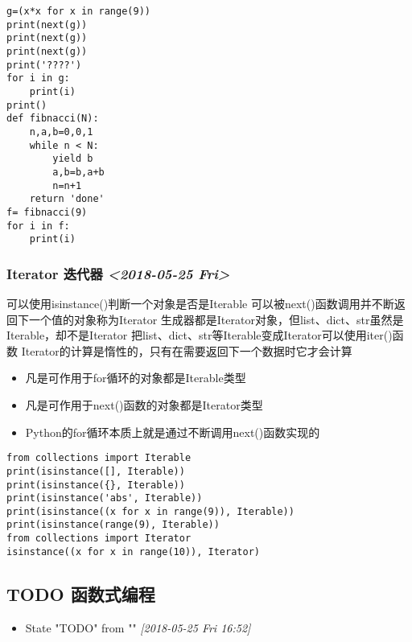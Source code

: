 \documentclass[11pt]{article}
\begin{document}
\begin{verbatim}
g=(x*x for x in range(9))
print(next(g))
print(next(g))
print(next(g))
print('????')
for i in g:
    print(i)
print()
def fibnacci(N):
    n,a,b=0,0,1
    while n < N:
        yield b
        a,b=b,a+b
        n=n+1
    return 'done'
f= fibnacci(9)
for i in f:
    print(i)
\end{verbatim}

\subsubsection{Iterator 迭代器 \textit{<2018-05-25 Fri>}}
\label{sec:org02ee4cb}
可以使用isinstance()判断一个对象是否是Iterable
可以被next()函数调用并不断返回下一个值的对象称为Iterator
生成器都是Iterator对象，但list、dict、str虽然是Iterable，却不是Iterator
把list、dict、str等Iterable变成Iterator可以使用iter()函数
Iterator的计算是惰性的，只有在需要返回下一个数据时它才会计算
\begin{itemize}
\item 凡是可作用于for循环的对象都是Iterable类型
\item 凡是可作用于next()函数的对象都是Iterator类型
\item Python的for循环本质上就是通过不断调用next()函数实现的
\end{itemize}
\begin{verbatim}
from collections import Iterable
print(isinstance([], Iterable))
print(isinstance({}, Iterable))
print(isinstance('abs', Iterable))
print(isinstance((x for x in range(9)), Iterable))
print(isinstance(range(9), Iterable))
from collections import Iterator
isinstance((x for x in range(10)), Iterator)

\end{verbatim}
\subsection{{\bfseries\sffamily TODO} 函数式编程}
\label{sec:org04e6682}
\begin{itemize}
\item State "TODO"       from ""           \textit{[2018-05-25 Fri 16:52]}
\end{itemize}
\end{document}
